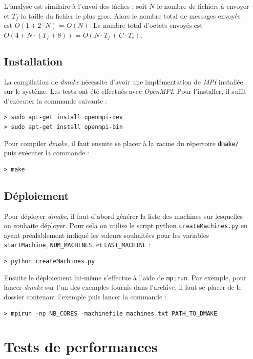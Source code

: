 \documentclass[a4paper,12pt,twoside]{article}
\begin{document}
L'analyse est similaire à l'envoi des tâches : soit \texttt{$N$} le
nombre de fichiers à envoyer et \texttt{$T_f$} la taille du fichier le
plus gros. Alors le nombre total de messages envoyés est \texttt{$O(1
  + 2 \cdot N)$} = \texttt{$O(N)$}. Le nombre total d'octets envoyés
est \texttt{$O(4 + N \cdot (T_f+8))$} = \texttt{$O(N \cdot T_f + C
  \cdot T_c)$}. 

\subsection{Installation}

La compilation de \emph{dmake} nécessite d'avoir une implémentation de
\emph{MPI} installée sur le système.
Les tests ont été effectués avec \emph{OpenMPI}. Pour l'installer, il
suffit d'exécuter la commande suivante :
\begin{verbatim}
> sudo apt-get install openmpi-dev
> sudo apt-get install openmpi-bin
\end{verbatim}

Pour compiler \emph{dmake}, il faut ensuite se placer à la racine du
répertoire \texttt{dmake/} puis exécuter la commande :
\begin{verbatim}
> make
\end{verbatim}

\subsection{Déploiement}

Pour déployer \emph{dmake}, il faut d'abord générer la liste des
machines sur lesquelles on souhaite déployer. Pour cela on utilise le
script python \texttt{createMachines.py} en ayant préalablement indiqué
les valeurs souhaitées pour les variables \texttt{startMachine},
\texttt{NUM\_MACHINES}, et \texttt{LAST\_MACHINE} : 
\begin{verbatim}
> python createMachines.py
\end{verbatim}

Ensuite le déploiement lui-même s'effectue à l'aide de
\texttt{mpirun}. Par exemple, pour lancer \emph{dmake} sur l'un des
exemples fournis dans l'archive, il faut se placer de le dossier
contenant l'exemple puis lancer la commande :
\begin{verbatim}
> mpirun -np NB_CORES -machinefile machines.txt PATH_TO_DMAKE
\end{verbatim}

\section{Tests de performances}
\end{document}
